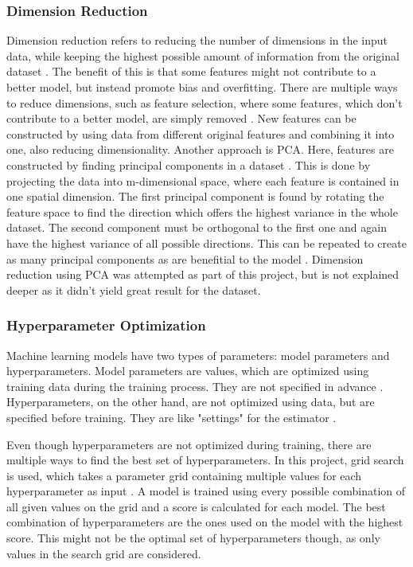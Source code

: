 \subsubsection{Dimension Reduction}
\label{sec:Dimension Reduction}

Dimension reduction refers to reducing the number of dimensions
in the input data, while keeping the highest possible amount of information from
the original dataset \cite[53]{Subasi2020}. The benefit of this is that some features might not contribute to a better model,
but instead promote bias and overfitting.
There are multiple ways to reduce dimensions, such as feature selection, where some features, which don't
contribute to a better model, are simply removed \cite[55]{Subasi2020}.
New features can be constructed by using data from different original features and
combining it into one, also reducing dimensionality.
Another approach is \ac{PCA}. Here, features are constructed by finding
principal components in a dataset \cite[62f]{Subasi2020}. This is done by projecting the data into m-dimensional space,
where each feature is contained in one spatial dimension.
The first principal component is found by rotating the feature space to find the direction
which offers the highest variance in the whole dataset.
The second component must be orthogonal to the first one and again have the highest variance
of all possible directions. This can be repeated to create as many principal components as are benefitial to the model \cite[62f]{Subasi2020}.
Dimension reduction using \ac{PCA} was attempted as part of this project,
but is not explained deeper as it didn't yield great result for the dataset.

\subsubsection{Hyperparameter Optimization}

Machine learning models have two types of parameters: model parameters and hyperparameters.
Model parameters are values, which are optimized using training data during the training process.
They are not specified in advance \cite[21]{Raschka2018}.
Hyperparameters, on the other hand, are not optimized using data, but are specified before training.
They are like "settings" for the estimator \cite{scikit-hyperparameters}.

Even though hyperparameters are not optimized during training,
there are multiple ways to find the best set of hyperparameters.
In this project, grid search is used, which takes a parameter grid containing
multiple values for each hyperparameter as input \cite{scikit-hyperparameters}.
A model is trained using every possible combination of all given values on the grid and a score
is calculated for each model. The best combination of hyperparameters are the ones used on the model
with the highest score. This might not be the optimal set of hyperparameters though, as only values
in the search grid are considered.

